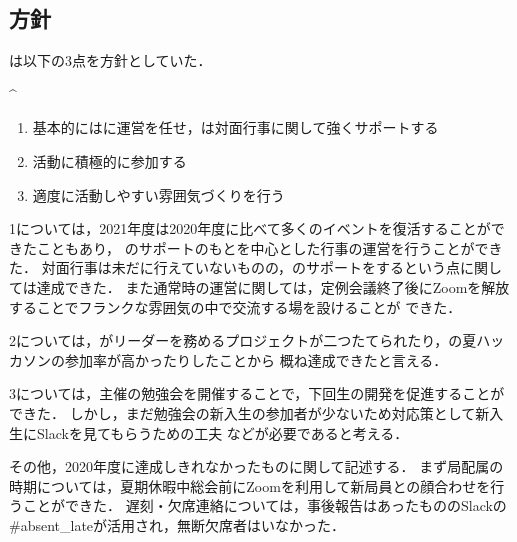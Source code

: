 \subsection*{\newGradeIfKouki{}\thirdGrade{}方針}


\thirdGrade{}は以下の3点を方針としていた．

^\begin{enumerate}
    \item 基本的には\secondGrade{}に運営を任せ，\thirdGrade{}は対面行事に関して強くサポートする
    \item 活動に積極的に参加する
    \item 適度に活動しやすい雰囲気づくりを行う
\end{enumerate}


1については，2021年度は2020年度に比べて多くのイベントを復活することができたこともあり，
\thirdGrade{}のサポートのもと\secondGrade{}を中心とした行事の運営を行うことができた．
対面行事は未だに行えていないものの，\secondGrade{}のサポートをするという点に関しては達成できた．
また通常時の運営に関しては，定例会議終了後にZoomを解放することでフランクな雰囲気の中で交流する場を設けることが
できた．

2については，\thirdGrade{}がリーダーを務めるプロジェクトが二つたてられたり，\thirdGrade{}の夏ハッカソンの参加率が高かったりしたことから
概ね達成できたと言える．

3については，\thirdGrade{}主催の勉強会を開催することで，下回生の開発を促進することができた．
しかし，まだ勉強会の新入生の参加者が少ないため対応策として新入生にSlackを見てもらうための工夫
などが必要であると考える．

その他，2020年度に達成しきれなかったものに関して記述する．
まず局配属の時期については，夏期休暇中総会前にZoomを利用して新局員との顔合わせを行うことができた．
遅刻・欠席連絡については，事後報告はあったもののSlackの#absent_lateが活用され，無断欠席者はいなかった．

